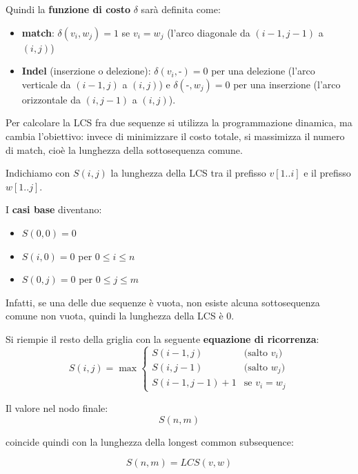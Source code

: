 Quindi la \textbf{funzione di costo} $\delta$ sarà definita come:
\begin{itemize}
    \item \textbf{match}: $\delta(v_i, w_j) = 1$ se $v_i = w_j$ (l'arco diagonale da $(i-1,j-1)$ a $(i,j)$)
    \item \textbf{Indel} (inserzione o delezione): $\delta(v_i,\text{-})=0$ per una delezione (l'arco verticale da $(i-1,j)$ a $(i,j)$) e $\delta(\text{-},w_j)=0$ per una inserzione (l'arco orizzontale da $(i,j-1)$ a $(i,j)$).
\end{itemize}

Per calcolare la LCS fra due sequenze si utilizza la programmazione dinamica, ma cambia l'obiettivo: invece di minimizzare il costo totale, si massimizza il numero di match, cioè la lunghezza della sottosequenza comune.

Indichiamo con $S(i,j)$ la lunghezza della LCS tra il prefisso $v[1..i]$ e il prefisso $w[1..j]$.

I \textbf{casi base} diventano:
\begin{itemize}
    \item $S(0,0)=0$
    \item $S(i,0)=0$ per $0 \leq i \leq n$
    \item $S(0,j)=0$ per $0 \leq j \leq m$
\end{itemize}

Infatti, se una delle due sequenze è vuota, non esiste alcuna sottosequenza comune non vuota, quindi la lunghezza della LCS è $0$.

Si riempie il resto della griglia con la seguente \textbf{equazione di ricorrenza}:
\begin{equation}
    S(i,j)=\max
    \begin{cases}
        S(i-1,j) & \text{(salto } v_i\text{)} \\
        S(i,j-1) & \text{(salto } w_j\text{)} \\
        S(i-1,j-1)+1 & \text{se } v_i=w_j
    \end{cases}
\end{equation}

Il valore nel nodo finale:
\begin{equation}
    S(n,m)
\end{equation}

coincide quindi con la lunghezza della longest common subsequence:

\begin{equation}
     S(n,m)=LCS(v,w)
\end{equation}

